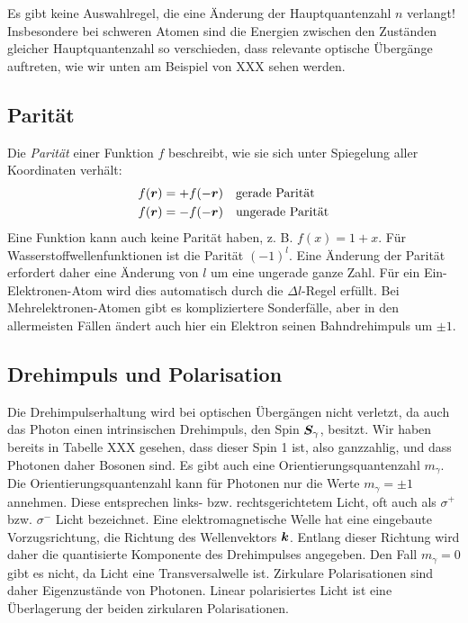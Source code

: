 Es gibt keine Auswahlregel, die eine Änderung der Hauptquantenzahl $n$ verlangt! Insbesondere bei schweren Atomen sind die Energien zwischen den Zuständen gleicher Hauptquantenzahl so verschieden, dass relevante optische Übergänge auftreten, wie wir unten am Beispiel von XXX sehen werden.



\subsection{Parität}

Die \emph{Parität} einer Funktion $f$ beschreibt, wie sie sich unter Spiegelung aller Koordinaten verhält:
\begin{align}
    f(\boldsymbol{r}) = + f(- \boldsymbol{r}) & \quad \text{gerade Parität} \\
    f(\boldsymbol{r}) = - f(- \boldsymbol{r}) & \quad \text{ungerade Parität}
\end{align} 
Eine Funktion kann auch keine Parität haben, z. B. $f(x) = 1 + x$. Für Wasserstoffwellenfunktionen ist die Parität $(-1)^l$. Eine Änderung der Parität erfordert daher eine Änderung von $l$ um eine ungerade ganze Zahl. Für ein Ein-Elektronen-Atom wird dies automatisch durch die $\Delta l$-Regel erfüllt. Bei Mehrelektronen-Atomen gibt es kompliziertere Sonderfälle, aber in den allermeisten Fällen ändert auch hier ein Elektron seinen Bahndrehimpuls um $\pm 1$.


\subsection{Drehimpuls und Polarisation}

Die Drehimpulserhaltung wird bei optischen Übergängen nicht verletzt, da auch das Photon einen intrinsischen Drehimpuls, den Spin $\boldsymbol{S}_\gamma$, besitzt. Wir haben bereits in Tabelle XXX gesehen, dass dieser Spin 1 ist, also ganzzahlig, und dass Photonen daher Bosonen sind. Es gibt auch eine Orientierungsquantenzahl $m_\gamma$. Die Orientierungsquantenzahl kann für Photonen nur die Werte $m_\gamma = \pm 1$ annehmen. Diese entsprechen links- bzw. rechtsgerichtetem Licht, oft auch als $\sigma^+$ bzw. $\sigma^-$ Licht bezeichnet. Eine elektromagnetische Welle hat eine eingebaute Vorzugsrichtung, die Richtung des Wellenvektors $\boldsymbol{k}$. Entlang dieser Richtung wird daher die quantisierte Komponente des Drehimpulses angegeben. Den Fall $m_\gamma = 0$ gibt es nicht, da Licht eine Transversalwelle ist. Zirkulare Polarisationen sind daher Eigenzustände von Photonen. Linear polarisiertes Licht ist eine Überlagerung der beiden zirkularen Polarisationen.

